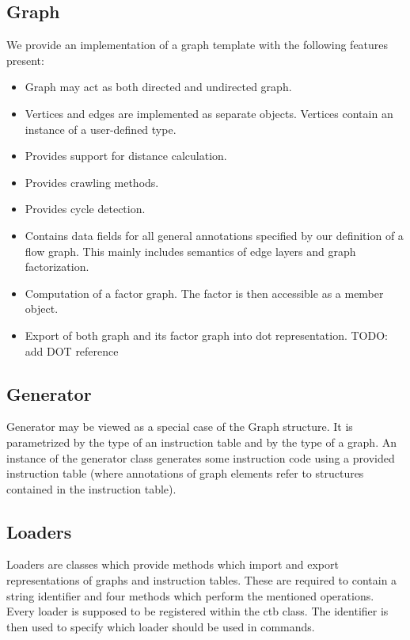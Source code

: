 \subsection*{Graph}

  We provide an implementation of a graph template with the following features present:

  \begin{itemize}
    \item Graph may act as both directed and undirected graph.
    \item Vertices and edges are implemented as separate objects. Vertices contain an instance of a user-defined type. 
    \item Provides support for distance calculation.
    \item Provides crawling methods.
    \item Provides cycle detection.
    \item Contains data fields for all general annotations specified by our definition of a flow graph. This mainly includes semantics of edge layers and graph factorization.
    \item Computation of a factor graph. The factor is then accessible as a member object.
    \item Export of both graph and its factor graph into dot representation. TODO: add DOT reference
  \end{itemize}

\subsection*{Generator}
  Generator may be viewed as a special case of the Graph structure. It is parametrized by the type of an instruction table and by the type of a graph. An instance of the generator class generates some instruction code using a provided instruction table (where annotations of graph elements refer to structures contained in the instruction table). 

\subsection*{Loaders}
  Loaders are classes which provide methods which import and export representations of graphs and instruction tables. These are required to contain a string identifier and four methods which perform the mentioned operations. Every loader is supposed to be registered within the ctb class. The identifier is then used to specify which loader should be used in commands.

